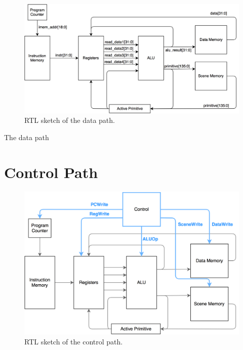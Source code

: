 \begin{figure}[h!]
    \includegraphics[width=\linewidth]{images/Data_path.png}
    \caption{RTL sketch of the data path.}
    \label{fig:datapath}
\end{figure}

The data path 

\section{Control Path}

\begin{figure}[h!]
    \includegraphics[width=\linewidth]{images/Control_signals.png}
    \caption{RTL sketch of the control path.}
    \label{fig:controlpath}
\end{figure}

